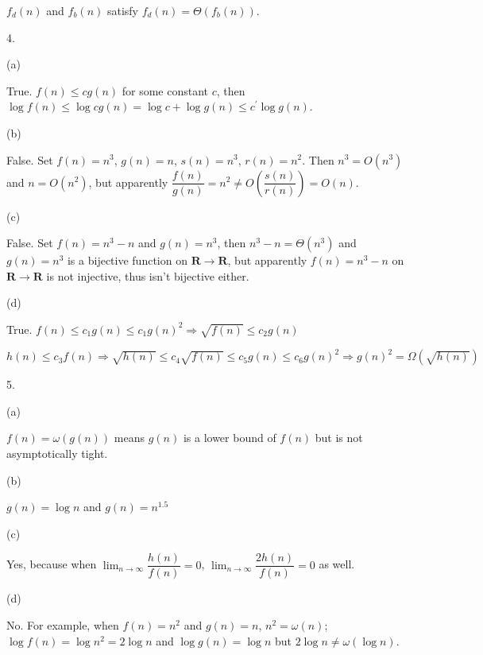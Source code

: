 \documentclass[UTF8,12pt,letterpaper,oneside]{amsart}
\begin{document}
$f_d (n)$ and $f_b (n)$ satisfy $f_d (n) = \Theta (f_b(n))$.

4.

(a)

True. $f(n) \leq cg(n)$ for some constant $c$, then $\log f(n) \leq \log cg(n) = \log c + \log g(n) \leq c^\prime \log g(n)$.

(b)

False. Set $f(n) = n^3$, $g(n) = n$, $s(n) = n^3$, $r(n) = n^2$. Then $n^3 = O (n^3)$ and $n = O(n^2)$, but apparently $\dfrac{f(n)}{g(n)} = n^2 \neq O\left(\dfrac{s(n)}{r(n)}\right) = O(n)$.

(c)

False. Set $f(n) = n^3 - n$ and $g(n) = n^3$, then $n^3 - n = \Theta(n^3)$ and $g(n) = n^3$ is a bijective function on $\mathbf{R} \rightarrow \mathbf{R}$, but apparently $f(n) = n^3 - n$ on $\mathbf{R} \rightarrow \mathbf{R}$ is not injective, thus isn't bijective either.

(d)

True. $f(n) \leq c_1 g(n) \leq c_1 g(n)^2 \Rightarrow \sqrt{f(n)} \leq c_2 g(n)$

$h(n) \leq c_3 f(n) \Rightarrow \sqrt{h(n)} \leq c_4 \sqrt{f(n)} \leq c_5 g(n) \leq c_6 g(n)^2 \Rightarrow g(n)^2 = \Omega \left(\sqrt{h(n)}\right)$

5.

(a)

$f(n) = \omega(g(n))$ means $g(n)$ is a lower bound of $f(n)$ but is not asymptotically tight.

(b)

$g(n) = \log n$ and $g(n) = n^{1.5}$

(c)

Yes, because when $\lim_{n \to \infty} \dfrac{h(n)}{f(n)} = 0$, $\lim_{n \to \infty} \dfrac{2h(n)}{f(n)} = 0$ as well.

(d)

No. For example, when $f(n) = n^2$ and $g(n) = n$, $n^2 = \omega(n)$; $\log f(n) = \log n^2 = 2 \log n$ and $\log g(n) = \log n$ but $2 \log n \neq \omega(\log n)$.
\end{document}
